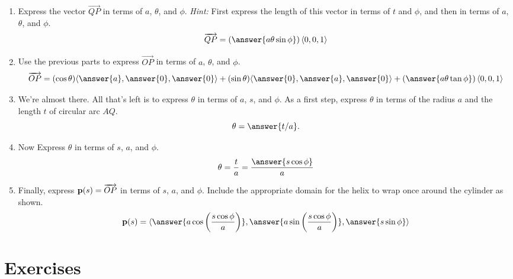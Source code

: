 \documentclass{ximera}
\begin{document}
\begin{question}
\begin{expandable}
\begin{enumerate}

\item Express the vector $\overrightarrow{QP}$ in terms of $a$, $\theta$, and $\phi$. \emph{Hint:} First express the length of this vector in terms of $t$ and $\phi$, and then in terms of $a$, $\theta$, and $\phi$.
\[
         \overrightarrow{QP} = \left( \answer{a\theta \sin\phi} \right) \langle 0,0,1  \rangle
\]

\item Use the previous parts to express $\overrightarrow{OP}$ in terms of $a$, $\theta$, and $\phi$.
\[
         \overrightarrow{OP} =    (\cos\theta)\langle \answer{a},\answer{0},\answer{0} \rangle + (\sin\theta)\langle \answer{0},\answer{a},\answer{0} \rangle +  \left( \answer{a\theta \tan\phi} \right) \langle 0,0,1  \rangle
\]


\item We're almost there. All that's left is to express $\theta$ in terms of $a$, $s$, and $\phi$.  As a first step, express $\theta$ in terms of the radius $a$ and the length $t$ of circular arc $AQ$. 
\[
            \theta = \answer{t/a} .
\]

\item Now Express $\theta$ in terms of $s$, $a$, and $\phi$. %
\[
     \theta = \frac{t}{a} = \frac{\answer{s \cos\phi}}{a}
\]

\item Finally, express ${\bf p}(s) = \overrightarrow{OP}$ in terms of $s$, $a$, and $\phi$. Include the appropriate domain for the helix to wrap once around the cylinder as shown.
\[
    {\bf p}(s) = \langle   \answer{a \cos \left( \frac{s\cos\phi}{a}\right)}      ,   \answer{a \sin \left( \frac{s\cos\phi}{a}\right)} , \answer {s \sin\phi}           \rangle
\]

\end{enumerate}
\end{expandable}
\end{question}





\section{Exercises}
\end{document}

